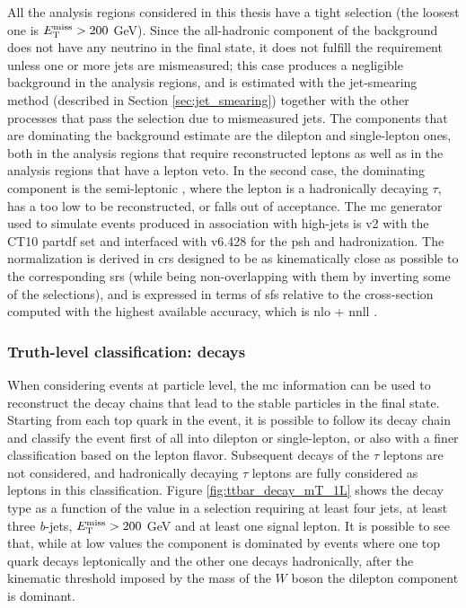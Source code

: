 All the analysis regions considered in this thesis have a tight \met selection (the loosest one is $E_{\rm T}^{\mathrm{miss}} > 200$ GeV). Since the all-hadronic component 
of the \ttbar background does not have any neutrino in the final state, it does not fulfill the \met requirement unless one or more jets are mismeasured; 
this case produces a negligible background in the analysis regions, and 
is estimated with the jet-smearing method (described in Section \ref{sec:jet_smearing}) together with the other processes that pass the selection due to mismeasured jets.
The \ttbar components that are dominating the background estimate are the dilepton and single-lepton ones, both in the analysis regions that require reconstructed leptons as well as in the analysis regions that have a lepton veto.
In the second case, the dominating component is the semi-leptonic \ttbar, where the lepton is a hadronically decaying $\tau$, has a \pt too low to be reconstructed, or falls out of acceptance. 
The \gls{mc} generator used to simulate \ttbar events produced in association with high-\pt jets is \PowhegBox v2 with the CT10 \gls{partdf} set \cite{Lai:2010vv} and interfaced with \PY v6.428 \cite{Sjostrand:2006za} for the \gls{psh} and hadronization. 
The normalization is derived in \glspl{cr} designed to be as kinematically close as possible to the corresponding \glspl{sr} (while being non-overlapping with them by inverting some of the selections), and is expressed in terms of \glspl{sf} relative to the cross-section computed with the highest
available accuracy, which is \gls{nlo} + \gls{nnll} \cite{Czakon:2011xx}.

\subsubsection*{Truth-level classification: \ttbar decays}

When considering events at particle level,
the \gls{mc} information can be used to reconstruct the decay chains that lead to the stable particles in the final state. 
Starting from each top quark in the event, it is possible to follow its decay chain and classify the event first of all into dilepton or single-lepton, or also with a finer classification based on the lepton flavor.  
Subsequent decays of the $\tau$ leptons are not considered, and hadronically decaying $\tau$ leptons are fully considered as leptons in this classification. 
Figure \ref{fig:ttbar_decay_mT_1L} shows the \ttbar decay type as a function of the \mt value  in a selection requiring at least four jets, at least three \textit{b}-jets, $E_{\rm T}^{\mathrm{miss}}>200$ GeV and at least one signal lepton. It is possible to see that, while at low \mt values the \ttbar component is dominated by events where one top quark decays leptonically and the other one decays hadronically, after the kinematic threshold imposed by the mass of the $W$ boson the dilepton component is dominant. 

